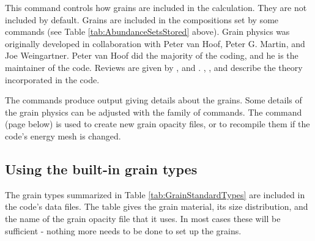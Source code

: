 This command controls how grains are included in the calculation.
They are not included by default.
Grains are included in the compositions set
by some  commands
(see Table \ref{tab:AbundanceSetsStored} above).
Grain physics
was originally developed in collaboration with
Peter van Hoof, Peter G. Martin, and
Joe Weingartner. Peter van Hoof did the majority of the coding,
and he is the maintainer of the code.
Reviews are given by \citet{Spitzer1948,Spitzer1978}, and \citet{Martin1979}.
\citet{Baldwin1991},
\citet{Weingartner2001b}, \citet{VanHoof2004} and
\citet{Weingartner2006} describe the theory incorporated in the code.

The  commands produce
output giving details about the grains.
Some details of the grain physics
can be adjusted with the  family of commands.
The  command
(page \pageref{sec:CompileGrains} below) is used to 
create new grain opacity files, or to recompile them if
the code's energy mesh is changed.

\subsection{Using the built-in grain types}

The grain types summarized in Table \ref{tab:GrainStandardTypes} are
included in the code's data files.
The table gives the grain material, its size distribution,
and the name of the grain opacity file that it uses.
In most cases these
will be sufficient - nothing more needs to be done to set up the grains.


